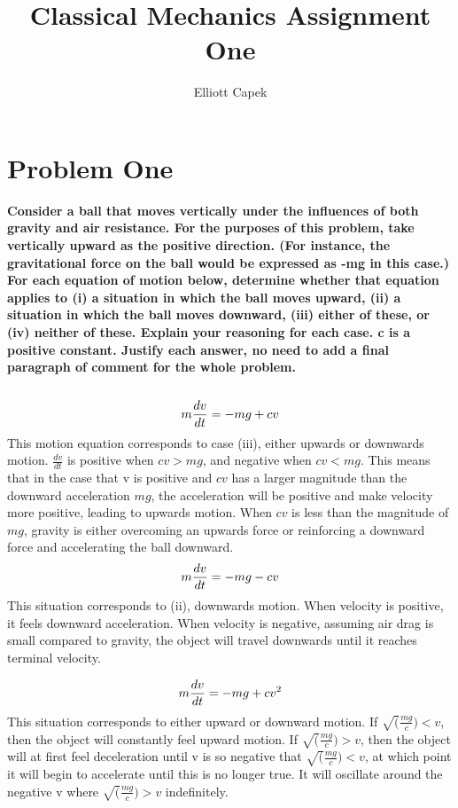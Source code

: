 \documentclass[10pt]{article} %
\title{Classical Mechanics Assignment One}
\author{Elliott Capek}
\begin{document}
\maketitle{}

\section{Problem One}
\textbf{Consider  a  ball  that  moves  vertically  under  the  influences  of  both  gravity  and  air resistance.  For  the  purposes  of  this  problem,  take  vertically  upward  as  the  positive direction. (For instance, the gravitational force on the ball would be expressed as -mg in this case.) For each equation of motion below, determine whether that equation applies 
to (i) a situation in which the ball moves upward, (ii) a situation in which the ball moves 
downward, (iii) either of these, or (iv) neither of these. Explain your reasoning for each 
case. c is a positive constant. Justify each answer, no need  to add a  final paragraph of 
comment for the whole problem.} \\ \\

\begin{equation}
  m\frac{dv}{dt} = -mg + cv\\
\end{equation}
This motion equation corresponds to case (iii), either upwards or downwards motion. $\frac{dv}{dt}$ is positive when $cv > mg$, and negative when $cv < mg$. This means that in the case that v is positive and $cv$ has a larger magnitude than the downward acceleration $mg$, the acceleration will be positive and make velocity more positive, leading to upwards motion. When $cv$ is less than the magnitude of $mg$, gravity is either overcoming an upwards force or reinforcing a downward force and accelerating the ball downward.\\

\begin{equation}
  m\frac{dv}{dt} = -mg - cv\\
\end{equation}
This situation corresponds to (ii), downwards motion. When velocity is positive, it feels downward acceleration. When velocity is negative, assuming air drag is small compared to gravity, the object will travel downwards until it reaches terminal velocity.

\begin{equation}
  m\frac{dv}{dt} = -mg + cv^2\\
\end{equation}
This situation corresponds to either upward or downward motion. If $\sqrt(\frac{mg}{c}) < v$, then the object will constantly feel upward motion. If $\sqrt(\frac{mg}{c}) > v$, then the object will at first feel deceleration until v is so negative that $\sqrt(\frac{mg}{c}) < v$, at which point it will begin to accelerate until this is no longer true. It will oscillate around the negative v where $\sqrt(\frac{mg}{c}) > v$ indefinitely.
\end{document}
